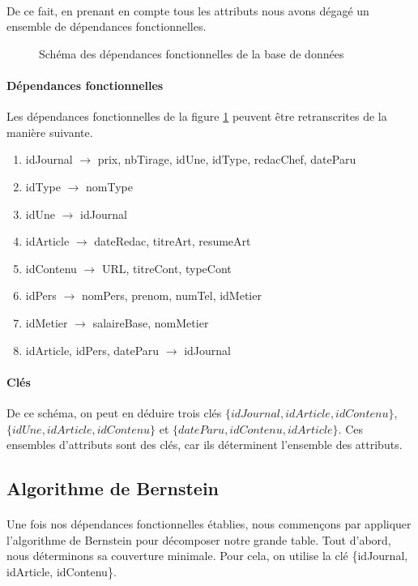 \paragraph{}{De ce fait, en prenant en compte tous les attributs nous avons dégagé un ensemble de dépendances fonctionnelles.}

\begin{figure}
	\centering
	
	\caption{Schéma des dépendances fonctionnelles de la base de données}
	\label{sch_df}
\end{figure} 

\paragraph{Dépendances fonctionnelles}{Les dépendances fonctionnelles de la figure \ref{sch_df} peuvent être retranscrites de la manière suivante.
}
\begin{enumerate}
    \item[(1)] idJournal $\rightarrow$ prix, nbTirage, idUne, idType, redacChef, dateParu
    \item[(2)] idType $\rightarrow$ nomType
    \item[(3)] idUne $\rightarrow$ idJournal
    \item[(4)] idArticle $\rightarrow$ dateRedac, titreArt, resumeArt
    \item[(5)] idContenu $\rightarrow$ URL, titreCont, typeCont
    \item[(6)] idPers $\rightarrow$ nomPers, prenom, numTel, idMetier
    \item[(7)] idMetier $\rightarrow$ salaireBase, nomMetier
    \item[(8)] idArticle, idPers, dateParu $\rightarrow$ idJournal
\end{enumerate}

\paragraph{Clés}{
    De ce schéma, on peut en déduire trois clés $\{idJournal, idArticle, idContenu\}$, $\{idUne, idArticle, idContenu\}$ et $\{dateParu, idContenu, idArticle\}$. Ces ensembles d'attributs sont des clés, car ils déterminent l'ensemble des attributs.
}

\subsection{Algorithme de Bernstein}
\paragraph{}{Une fois nos dépendances fonctionnelles établies, nous commençons par appliquer l'algorithme de Bernstein pour décomposer notre grande table. Tout d'abord, nous déterminons sa couverture minimale. Pour cela, on utilise la clé \{idJournal, idArticle, idContenu\}.
}

